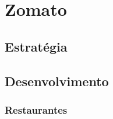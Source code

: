 \documentclass[a4paper,10pt]{article}
\begin{document}
\section{Zomato}

\subsection{Estratégia}

\subsection{Desenvolvimento}

\newpage

\subsubsection{Restaurantes}
\end{document}
